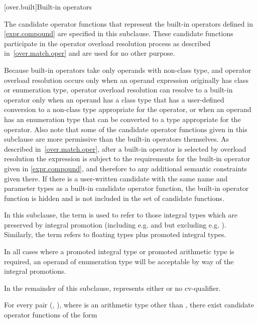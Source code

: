 [over.built]{Built-in operators}%

\pnum
The candidate operator functions that represent the built-in operators
defined in \ref{expr.compound} are specified in this subclause.
These candidate
functions participate in the operator overload resolution process as
described in~\ref{over.match.oper} and are used for no other purpose.
\begin{note}
Because built-in operators take only operands with non-class type,
and operator overload resolution occurs only when an operand expression
originally has class or enumeration type,
operator overload resolution can resolve to a built-in operator only
when an operand has a class type that has a user-defined conversion to
a non-class type appropriate for the operator, or when an operand has
an enumeration type that can be converted to a type appropriate
for the operator.
Also note that some of the candidate operator functions given in this subclause are
more permissive than the built-in operators themselves.
As
described in~\ref{over.match.oper}, after a built-in operator is selected
by overload resolution the expression is subject to the requirements for
the built-in operator given in \ref{expr.compound}, and therefore to any
additional semantic constraints given there.
If there is a user-written
candidate with the same name and parameter types as a built-in
candidate operator function, the built-in operator function
is hidden and is not included in the set of candidate functions.
\end{note}

\pnum
{}%
%
In this subclause, the term
is used to refer to those integral types which are preserved by
integral promotion (including e.g.
and
but excluding e.g.
).
Similarly, the term
refers to floating types plus promoted integral types.
\begin{note}
In all cases where a promoted integral type or promoted arithmetic type is
required, an operand of enumeration type will be acceptable by way of the
integral promotions.
\end{note}

\pnum
In the remainder of this subclause,  represents either
 or no cv-qualifier.

\pnum
For every pair
(,
),
where
is an arithmetic type other than ,
there exist candidate operator functions of the form

